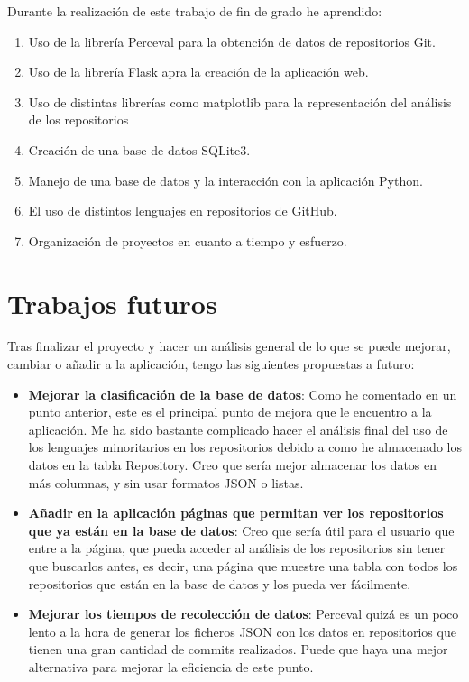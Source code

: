 \documentclass[a4paper, 12pt]{book}
\begin{document}
Durante la realización de este trabajo de fin de grado he aprendido:

\begin{enumerate}
  \item Uso de la librería Perceval para la obtención de datos de repositorios Git.
  \item Uso de la librería Flask apra la creación de la aplicación web.
  \item Uso de distintas librerías como matplotlib para la representación del análisis de los repositorios
  \item Creación de una base de datos SQLite3.
  \item Manejo de una base de datos y la interacción con la aplicación Python.
  \item El uso de distintos lenguajes en repositorios de GitHub.
  \item Organización de proyectos en cuanto a tiempo y esfuerzo.
\end{enumerate}


\section{Trabajos futuros}
\label{sec:trabajos_futuros}

Tras finalizar el proyecto y hacer un análisis general de lo que se puede mejorar, cambiar o añadir a la aplicación, tengo las siguientes propuestas a futuro:

\begin{itemize}
\item \textbf{Mejorar la clasificación de la base de datos}: Como he comentado en un punto anterior, este es el principal punto de mejora que le encuentro a la aplicación. Me ha sido bastante complicado hacer el análisis final del uso de los lenguajes minoritarios en los repositorios debido a como he almacenado los datos en la tabla Repository. Creo que sería mejor almacenar los datos en más columnas, y sin usar formatos JSON o listas.
\item \textbf{Añadir en la aplicación páginas que permitan ver los repositorios que ya están en la base de datos}: Creo que sería útil para el usuario que entre a la página, que pueda acceder al análisis de los repositorios sin tener que buscarlos antes, es decir, una página que muestre una tabla con todos los repositorios que están en la base de datos y los pueda ver fácilmente.
\item \textbf{Mejorar los tiempos de recolección de datos}: Perceval quizá es un poco lento a la hora de generar los ficheros JSON con los datos en repositorios que tienen una gran cantidad de commits realizados. Puede que haya una mejor alternativa para mejorar la eficiencia de este punto.
\end{itemize}
\end{document}
